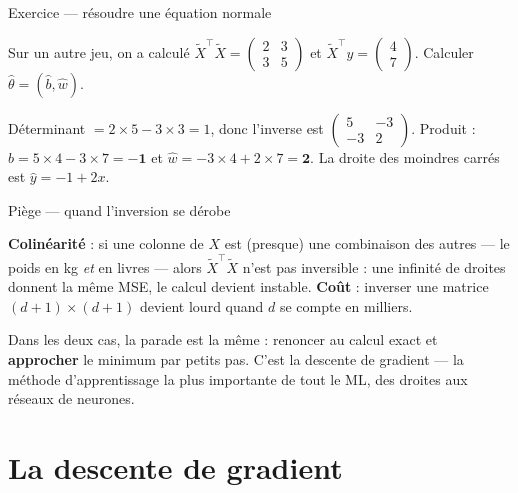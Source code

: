 \documentclass[aspectratio=169,11pt]{beamer}
\begin{document}
\begin{frame}{Exercice — résoudre une équation normale}
\begin{ucadrec}[Énoncé]
{\small Sur un autre jeu, on a calculé $\tilde X^{\top}\tilde X = \begin{pmatrix} 2 & 3\\ 3 & 5 \end{pmatrix}$ et $\tilde X^{\top} y = \begin{pmatrix} 4\\ 7 \end{pmatrix}$. Calculer $\hat\theta = (\hat b, \hat w)$.}
\end{ucadrec}
\pause
\begin{ucadex}[Correction]
{\small Déterminant $= 2\times 5 - 3\times 3 = 1$, donc l'inverse est $\begin{pmatrix} 5 & -3\\ -3 & 2 \end{pmatrix}$. Produit : $\hat b = 5\times 4 - 3\times 7 = \mathbf{-1}$ et $\hat w = -3\times 4 + 2\times 7 = \mathbf{2}$. La droite des moindres carrés est $\hat y = -1 + 2x$.}
\end{ucadex}
\end{frame}

\begin{frame}{Piège — quand l'inversion se dérobe}
\begin{ucadpiege}
{\small \textbf{Colinéarité} : si une colonne de $X$ est (presque) une combinaison des autres — le poids en kg \emph{et} en livres — alors $\tilde X^{\top}\tilde X$ n'est pas inversible : une infinité de droites donnent la même MSE, le calcul devient instable. \textbf{Coût} : inverser une matrice $(d+1)\times(d+1)$ devient lourd quand $d$ se compte en milliers.}
\end{ucadpiege}
{\small Dans les deux cas, la parade est la même : renoncer au calcul exact et \textbf{approcher} le minimum par petits pas. C'est la descente de gradient — la méthode d'apprentissage la plus importante de tout le ML, des droites aux réseaux de neurones.}
\end{frame}

\section{La descente de gradient}
\end{document}
